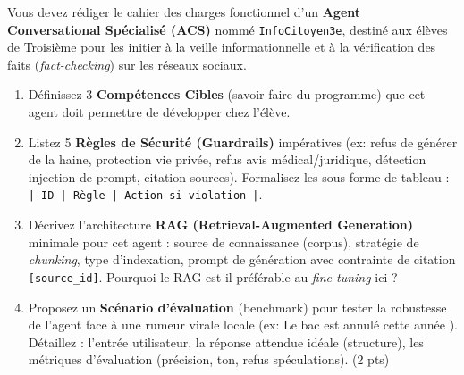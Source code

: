\documentclass[11pt]{article}
\begin{document}
\begin{exercice}
Vous devez rédiger le cahier des charges fonctionnel d'un \textbf{Agent Conversational Spécialisé (ACS)} nommé \texttt{InfoCitoyen3e}, destiné aux élèves de Troisième pour les initier à la veille informationnelle et à la vérification des faits (\textit{fact-checking}) sur les réseaux sociaux.
\begin{enumerate}
    \item Définissez 3 \textbf{Compétences Cibles} (savoir-faire du programme) que cet agent doit permettre de développer chez l'élève.
    \item Listez 5 \textbf{Règles de Sécurité (Guardrails)} impératives (ex: refus de générer de la haine, protection vie privée, refus avis médical/juridique, détection injection de prompt, citation sources). Formalisez-les sous forme de tableau : \texttt{| ID | Règle | Action si violation |}.
    \item Décrivez l'architecture \textbf{RAG (Retrieval-Augmented Generation)} minimale pour cet agent : source de connaissance (corpus), stratégie de \textit{chunking}, type d'indexation, prompt de génération avec contrainte de citation \texttt{[source\_id]}. Pourquoi le RAG est-il préférable au \textit{fine-tuning} ici ?
    \item Proposez un \textbf{Scénario d'évaluation} (benchmark) pour tester la robustesse de l'agent face à une \og rumeur virale \fg{} locale (ex: \og Le bac est annulé cette année \fg{}). Détaillez : l'entrée utilisateur, la réponse attendue idéale (structure), les métriques d'évaluation (précision, ton, refus spéculations). (2 pts)
\end{enumerate}
\end{exercice}
\end{document}
